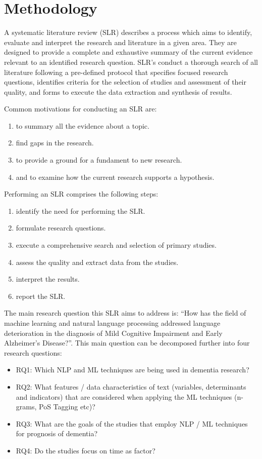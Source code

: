 \documentclass[12pt]{article}
\begin{document}
\section{Methodology}\label{methodology}
A systematic literature review (SLR) describes a process which aims to identify, evaluate and interpret the research and literature in a given area. They are designed to provide a complete and exhaustive summary of the current evidence relevant to an identified research question. SLR's conduct a thorough search of all literature following a pre-defined protocol that specifies focused research questions, identifies criteria for the selection of studies and assessment of their quality, and forms to execute the data extraction and synthesis of results. 
\par 
Common motivations for conducting an SLR are: 
\begin{enumerate}
	\item to summary all the evidence about a topic.
	\item find gaps in the research. 
	\item to provide a ground for a fundament to new research.
	\item and to examine how the current research supports a hypothesis. 
\end{enumerate}

Performing an SLR comprises the following steps: 

\begin{enumerate}
	\item identify the need for performing the SLR.
	\item formulate research questions.
	\item execute a comprehensive search and selection of primary studies.
	\item assess the quality and extract data from the studies.
	\item interpret the results.
	\item report the SLR.
\end{enumerate}

The main research question this SLR aims to address is: “How has the field of machine learning and natural language processing addressed language deterioration in the diagnosis of Mild Cognitive Impairment and Early Alzheimer's Disease?”. This main question can be decomposed further into four research questions:
\begin{itemize}
	\item RQ1: Which NLP and ML techniques are being used in dementia research?
	\item RQ2: What features / data characteristics of text (variables, determinants and indicators) that are considered when applying the ML techniques (n-grams, PoS Tagging etc)?
	\item RQ3: What are the goals of the studies that employ NLP / ML techniques for prognosis of dementia?
	\item RQ4: Do the studies focus on time as factor?
\end{itemize}
\end{document}
